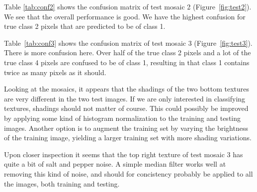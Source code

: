 \documentclass[a4paper]{article}
\begin{document}
Table \ref{tab:conf2} shows the confusion matrix of test mosaic 2
(Figure~\ref{fig:test2}). We see that the overall performance is good.
We have the highest confusion for true class 2 pixels that are predicted
to be of class 1.

Table~\ref{tab:conf3} shows the confusion matrix of test mosaic 3
(Figure~\ref{fig:test3}). There is more confusion here. Over half of the
true class 2 pixels and a lot of the true class 4 pixels are confused
to be of class 1, resulting in that class 1 contains twice as many
pixels as it should.

Looking at the mosaics, it appears that the shadings of the two bottom
textures are very different in the two test images. If we are only
interested in classifying textures, shadings should not matter of
course. This could possibly be improved by applying some kind of
histogram normalization to the training and testing images. Another
option is to augment the training set by varying the brightness of the
training image, yielding a larger training set with more shading
variations.

Upon closer inspection it seems that the top right texture of test
mosaic 3 has quite a bit of salt and pepper noise. A simple median
filter works well at removing this kind of noise, and should for
concistency probably be applied to all the images, both training and
testing.
\end{document}
